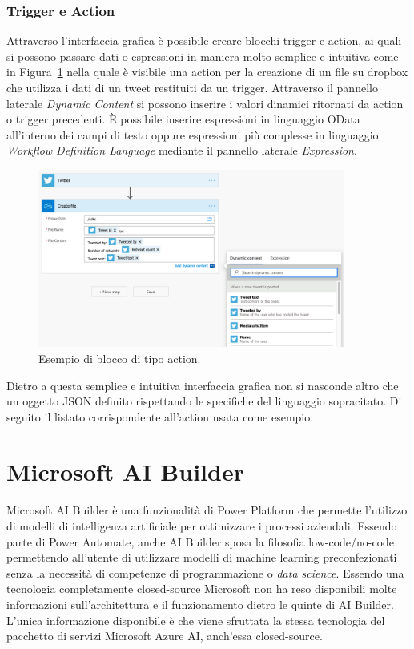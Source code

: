 \subsubsection{Trigger e Action}
Attraverso l'interfaccia grafica è possibile creare blocchi trigger e action, ai quali si possono passare dati o espressioni in maniera molto semplice e intuitiva come in Figura~\ref{fig:actionExample} nella quale è visibile una action per la creazione di un file su dropbox che utilizza i dati di un tweet restituiti da un trigger. Attraverso il pannello laterale \textit{Dynamic Content} si possono inserire i valori dinamici ritornati da action o trigger precedenti. È possibile inserire espressioni in linguaggio OData all'interno dei campi di testo oppure espressioni più complesse  in linguaggio \textit{Workflow Definition Language} mediante il pannello laterale \textit{Expression}\cite{WorkflowDefinitioLanguage}.
\begin{figure}[ht]
  \centering
  \includegraphics[width=0.9\textwidth]{action-example.png}
  \caption{Esempio di blocco di tipo action.}
  \label{fig:actionExample}
\end{figure}

Dietro a questa semplice e intuitiva interfaccia grafica non si nasconde altro che un oggetto JSON definito rispettando le specifiche del linguaggio sopracitato. Di seguito il listato corrispondente all'action usata come esempio.



 \section{Microsoft AI Builder}
Microsoft AI Builder è una funzionalità di Power Platform che permette l'utilizzo di modelli di intelligenza artificiale per ottimizzare i processi aziendali. Essendo parte di Power Automate, anche AI Builder sposa la filosofia low-code/no-code permettendo all'utente di utilizzare modelli di machine learning preconfezionati senza la necessità di competenze di programmazione o \textit{data science}.
Essendo una tecnologia completamente closed-source Microsoft non ha reso disponibili molte informazioni sull'architettura e il funzionamento dietro le quinte di AI Builder. L'unica informazione disponibile è che viene sfruttata la stessa tecnologia del pacchetto di servizi Microsoft Azure AI, anch'essa closed-source.

